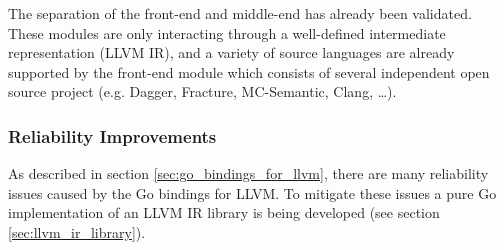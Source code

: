 The separation of the front-end and middle-end has already been validated. These modules are only interacting through a well-defined intermediate representation (LLVM IR), and a variety of source languages are already supported by the front-end module which consists of several independent open source project (e.g. Dagger, Fracture, MC-Semantic, Clang, …).


\subsubsection{Reliability Improvements}

As described in section \ref{sec:go_bindings_for_llvm}, there are many reliability issues caused by the Go bindings for LLVM. To mitigate these issues a pure Go implementation of an LLVM IR library is being developed (see section \ref{sec:llvm_ir_library}).



































